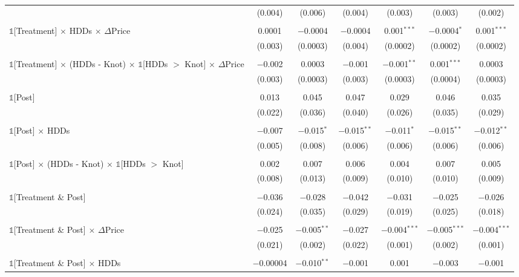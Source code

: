 \begin{table}[!htbp]
\begin{longtable}{@{\extracolsep{15pt}}lcccccc}
  & (0.004) & (0.006) & (0.004) & (0.003) & (0.003) & (0.002) \\ 
  & & & & & & \\ 
 $\mathbb{1}$[Treatment] $\times$ HDDs $\times$ $\Delta$Price & 0.0001 & $-$0.0004 & $-$0.0004 & 0.001$^{***}$ & $-$0.0004$^{*}$ & 0.001$^{***}$ \\ 
  & (0.003) & (0.0003) & (0.004) & (0.0002) & (0.0002) & (0.0002) \\ 
  & & & & & & \\ 
 $\mathbb{1}$[Treatment] $\times$ (HDDs - Knot) $\times$ $\mathbb{1}$[HDDs $>$ Knot] $\times$ $\Delta$Price & $-$0.002 & 0.0003 & $-$0.001 & $-$0.001$^{**}$ & 0.001$^{***}$ & 0.0003 \\ 
  & (0.003) & (0.0003) & (0.003) & (0.0003) & (0.0004) & (0.0003) \\ 
  & & & & & & \\ 
 $\mathbb{1}$[Post] & 0.013 & 0.045 & 0.047 & 0.029 & 0.046 & 0.035 \\ 
  & (0.022) & (0.036) & (0.040) & (0.026) & (0.035) & (0.029) \\ 
  & & & & & & \\ 
 $\mathbb{1}$[Post] $\times$ HDDs & $-$0.007 & $-$0.015$^{*}$ & $-$0.015$^{**}$ & $-$0.011$^{*}$ & $-$0.015$^{**}$ & $-$0.012$^{**}$ \\ 
  & (0.005) & (0.008) & (0.006) & (0.006) & (0.006) & (0.006) \\ 
  & & & & & & \\ 
 $\mathbb{1}$[Post] $\times$ (HDDs - Knot) $\times$ $\mathbb{1}$[HDDs $>$ Knot] & 0.002 & 0.007 & 0.006 & 0.004 & 0.007 & 0.005 \\ 
  & (0.008) & (0.013) & (0.009) & (0.010) & (0.010) & (0.009) \\ 
  & & & & & & \\ 
 $\mathbb{1}$[Treatment \& Post] & $-$0.036 & $-$0.028 & $-$0.042 & $-$0.031 & $-$0.025 & $-$0.026 \\ 
  & (0.024) & (0.035) & (0.029) & (0.019) & (0.025) & (0.018) \\ 
  & & & & & & \\ 
 $\mathbb{1}$[Treatment \& Post] $\times$ $\Delta$Price & $-$0.025 & $-$0.005$^{**}$ & $-$0.027 & $-$0.004$^{***}$ & $-$0.005$^{***}$ & $-$0.004$^{***}$ \\ 
  & (0.021) & (0.002) & (0.022) & (0.001) & (0.002) & (0.001) \\ 
  & & & & & & \\ 
 $\mathbb{1}$[Treatment \& Post] $\times$ HDDs & $-$0.00004 & $-$0.010$^{**}$ & $-$0.001 & 0.001 & $-$0.003 & $-$0.001 \\ 

\end{longtable}
\end{table}
